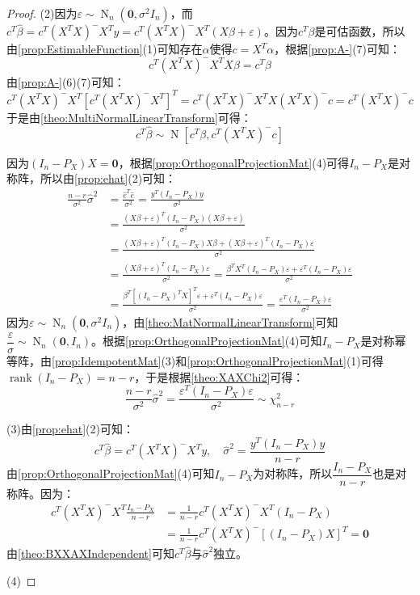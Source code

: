 \begin{proof}
	(2)因为$\varepsilon\sim\operatorname{N}_n(\mathbf{0},\sigma^2I_n)$，而$c^T\hat{\beta}=c^T(X^TX)^-X^Ty=c^T(X^TX)^-X^T(X\beta+\varepsilon)$。因为$c^T\beta$是可估函数，所以由\cref{prop:EstimableFunction}(1)可知存在$\alpha$使得$c=X^T\alpha$，根据\cref{prop:A-}(7)可知：
	\begin{equation*}
		c^T(X^TX)^-X^TX\beta=c^T\beta
	\end{equation*}
	由\cref{prop:A-}(6)(7)可知：
	\begin{equation*}
		c^T(X^TX)^-X^T[c^T(X^TX)^-X^T]^T=c^T(X^TX)^-X^TX(X^TX)^-c=c^T(X^TX)^-c
	\end{equation*}
	于是由\cref{theo:MultiNormalLinearTransform}可得：
	\begin{equation*}
		c^T\hat{\beta}\sim\operatorname{N}[c^T\beta,c^T(X^TX)^-c]
	\end{equation*}\par
	因为$(I_n-P_X)X=\mathbf{0}$，根据\cref{prop:OrthogonalProjectionMat}(4)可得$I_n-P_X$是对称阵，所以由\cref{prop:ehat}(2)可知：
	\begin{align*}
		\frac{n-r}{\sigma^2}\hat{\sigma}^2&=\frac{\hat{e}^T\hat{e}}{\sigma^2}=\frac{y^T(I_n-P_X)y}{\sigma^2} \\
		&=\frac{(X\beta+\varepsilon)^T(I_n-P_X)(X\beta+\varepsilon)}{\sigma^2} \\
		&=\frac{(X\beta+\varepsilon)^T(I_n-P_X)X\beta+(X\beta+\varepsilon)^T(I_n-P_X)\varepsilon}{\sigma^2} \\
		&=\frac{(X\beta+\varepsilon)^T(I_n-P_X)\varepsilon}{\sigma^2}=\frac{\beta^TX^T(I_n-P_X)\varepsilon+\varepsilon^T(I_n-P_X)\varepsilon}{\sigma^2} \\
		&=\frac{\beta^T[(I_n-P_X)^TX]^T\varepsilon+\varepsilon^T(I_n-P_X)\varepsilon}{\sigma^2}=\frac{\varepsilon^T(I_n-P_X)\varepsilon}{\sigma^2}
	\end{align*}
	因为$\varepsilon\sim\operatorname{N}_n(\mathbf{0},\sigma^2I_n)$，由\cref{theo:MatNormalLinearTransform}可知$\dfrac{\varepsilon}{\sigma}\sim\operatorname{N}_n(\mathbf{0},I_n)$。根据\cref{prop:OrthogonalProjectionMat}(4)可知$I_n-P_X$是对称幂等阵，由\cref{prop:IdempotentMat}(3)和\cref{prop:OrthogonalProjectionMat}(1)可得$\operatorname{rank}(I_n-P_X)=n-r$，于是根据\cref{theo:XAXChi2}可得：
	\begin{equation*}
		\frac{n-r}{\sigma^2}\hat{\sigma}^2=\frac{\varepsilon^T(I_n-P_X)\varepsilon}{\sigma^2}\sim\chi_{n-r}^2
	\end{equation*}\par
	(3)由\cref{prop:ehat}(2)可知：
	\begin{equation*}
		c^T\hat{\beta}=c^T(X^TX)^-X^Ty,\quad\hat{\sigma}^2=\frac{y^T(I_n-P_X)y}{n-r}
	\end{equation*}
	由\cref{prop:OrthogonalProjectionMat}(4)可知$I_n-P_X$为对称阵，所以$\dfrac{I_n-P_X}{n-r}$也是对称阵。因为：
	\begin{align*}
		c^T(X^TX)^-X^T\frac{I_n-P_X}{n-r}&=\frac{1}{n-r}c^T(X^TX)^-X^T(I_n-P_X) \\
		&=\frac{1}{n-r}c^T(X^TX)^-[(I_n-P_X)X]^T=\mathbf{0}
	\end{align*}
	由\cref{theo:BXXAXIndependent}可知$c^T\hat{\beta}$与$\hat{\sigma}^2$独立。\par
	(4)
\end{proof}

